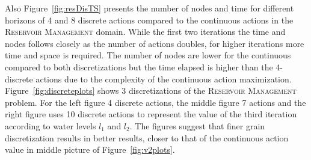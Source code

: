 \documentclass[twoside,11pt]{article}
\newcommand{\InventoryControl}{\textsc{Inventory Control }}
\newcommand{\WaterReservoir}{\textsc{Reservoir Management }}
\begin{document}
Also Figure~\ref{fig:resDisTS} presents the number of nodes and time for different horizons of 4 and 8 discrete actions compared to the continuous actions in the \WaterReservoir domain. While the first two iterations the time and nodes follows closely as the number of actions doubles, for higher iterations more time and space is required. The number of nodes are lower for the continuous compared to both discretizations but the time elapsed is higher than the 4-discrete actions due to the complexity of the continuous action maximization.
Figure~\ref{fig:discreteplots} shows 3 discretizations of the \WaterReservoir problem. For the left figure 4 discrete actions, the middle figure 7 actions and the right figure uses 10 discrete actions to represent the value of the third iteration according to water levels $l_1$ and $l_2$. The figures suggest that finer grain discretization results in better results, closer to that of the continuous action value in middle picture of Figure~\ref{fig:v2plots}. 
\end{document}
